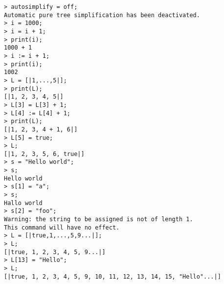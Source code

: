 \begin{center}\begin{minipage}{15cm}\begin{Verbatim}[frame=single]
> autosimplify = off;
Automatic pure tree simplification has been deactivated.
> i = 1000;
> i = i + 1;
> print(i);
1000 + 1
> i := i + 1;
> print(i);
1002
> L = [|1,...,5|];
> print(L);
[|1, 2, 3, 4, 5|]
> L[3] = L[3] + 1;
> L[4] := L[4] + 1;
> print(L);
[|1, 2, 3, 4 + 1, 6|]
> L[5] = true;
> L;
[|1, 2, 3, 5, 6, true|]
> s = "Hello world";
> s;
Hello world
> s[1] = "a";
> s;
Hallo world
> s[2] = "foo";
Warning: the string to be assigned is not of length 1.
This command will have no effect.
> L = [|true,1,...,5,9...|];
> L;
[|true, 1, 2, 3, 4, 5, 9...|]
> L[13] = "Hello";
> L;
[|true, 1, 2, 3, 4, 5, 9, 10, 11, 12, 13, 14, 15, "Hello"...|]
\end{Verbatim}
\end{minipage}\end{center}
